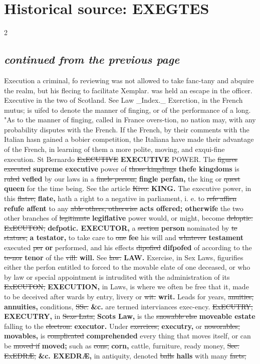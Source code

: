 \documentclass[10pt]{article}
\begin{document}
\section*{Historical source: EXEGTES}
\begin{multicols}{2}
\subsection*{\textit{continued from the previous page}}
Execution a criminal, fo reviewing was not allowed to take fanc-tany and abquire the realm, but his flecing to facilitate Xemplar. was held an escape in the officer. Executive in the two of Scotland. See Law \_Index.\_ Exerction, in the French mutus; is uifed to denote the manner of finging, or of the performance of a long. "As to the manner of finging, called in France overs-tion, no nation may, with any probability disputes with the French. If the French, by their comments with the Italian hasn gained a bobier competition, the Italiana have made their advantage of the French, in learning of them a more polite, moving, and exqui-fine execution. St Bernardo \sout{ExECUTIVE} \textbf{EXECUTIVE} POWER. The \sout{figures executed} \textbf{supreme executive} power of \sout{those kingdings} \textbf{thefe kingdoms} is \sout{ruled} \textbf{vefled} by our laws in a \sout{finele person,} \textbf{fingle perfan,} the king or \sout{quest} \textbf{queen} for the time being. See the article \sout{Kivo.} \textbf{KING.} The executive power, in this \sout{flatre,} \textbf{flate,} hath a right to a negative in parliament, i. e. to \sout{refe affien} \textbf{refufe affent} to any \sout{able others, otherwise} \textbf{acts offered; otherwife} the two other branches of \sout{legitimate} \textbf{legiflative} power would, or might, become \sout{deloptic. ExECUTON,} \textbf{defpotic. EXECUTOR,} a \sout{section} \textbf{person} nominated by \sout{te statues,} \textbf{a testator,} to take care to \sout{one} \textbf{fee} his will and \sout{whatever} \textbf{testament} executed \sout{per} \textbf{or} performed, and his effects \sout{dipofied} \textbf{difpofed} of according to the \sout{te-nor} \textbf{tenor} of the \sout{vill.} \textbf{will.} See \sout{law.} \textbf{LAW.} Exercise, in Sex Laws, figurifies either the perfon entitled to forced to the movable elate of one deceased, or who by law or special appointment is intrudited with the administration of its \sout{ExECUTON,} \textbf{EXECUTION,} in Laws, is where we often be free that it, made to be deceived after wards by entry, livery or \sout{wit.} \textbf{writ.} Leads for years, \sout{anuities,} \textbf{annuities,} conditions, \sout{SSc.} \textbf{\&c.} are termed interviances exec-ency. \sout{ExECUTRY,} \textbf{EXECUTRY,} in \sout{Sexe Lata,} \textbf{Scots Law,} is the \sout{snowable else} \textbf{moveable estate} falling to the \sout{electron.} \textbf{executor.} Under \sout{exercices,} \textbf{executry,} or \sout{noworables,} \textbf{movables,} is \sout{complicated} \textbf{comprehended} every thing that moves itself, or can be \sout{moved if} \textbf{moved;} such as \sout{cons,} \textbf{corn,} cattle, furniture, ready money, \sout{Sec. ExEDRÆ,} \textbf{\&c. EXEDRÆ,} in antiquity, denoted \sout{balls} \textbf{halls} with many \sout{facts,} 
\end{multicols}
\end{document}

